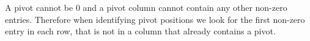 \documentclass[12pt letter]{report}
\begin{document}
A pivot cannot be 0 and a pivot column cannot contain any other non-zero entries. Therefore when identifying pivot
positions we look for the first non-zero entry in each row, that is not in a column that already contains a pivot.

\end{document}
